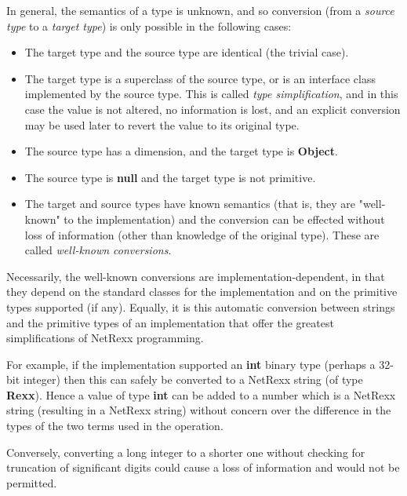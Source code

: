 In general, the semantics of a type is unknown, and so conversion (from
a \emph{source type} to a \emph{target type}) is only possible in
the following cases:
\begin{itemize}
\item The target type and the source type are identical (the trivial
case).
\item 
The target type is a superclass of the source type, or is an
interface class implemented by the source type.
This is called \emph{type simplification}, and in this case the value
is not altered, no information is lost, and an explicit conversion may
be used later to revert the value to its original type.
\item 
The source type has a dimension, and the target type
is \textbf{Object}.
\item 
The source type is \textbf{null} and the target type is not primitive.
\item 
{}
The target and source types have known semantics (that is, they are
"well-known" to the implementation) and the conversion can be
effected without loss of information (other than knowledge of the
original type).
These are called \emph{well-known conversions}.
\end{itemize}
 
Necessarily, the well-known conversions are implementation-dependent, in
that they depend on the standard classes for the implementation and on
the primitive types supported (if any).
Equally, it is this automatic conversion between strings and the
primitive types of an implementation that offer the greatest
simplifications of NetRexx programming.
 
For example, if the implementation supported an \textbf{int}
binary type (perhaps a 32-bit integer) then this can safely be
converted to a NetRexx string (of type \textbf{Rexx}).
Hence a value of type \textbf{int} can be added to a number which is a
NetRexx string (resulting in a NetRexx string) without concern over the
difference in the types of the two terms used in the operation.
 
Conversely, converting a long integer to a shorter one without checking
for truncation of significant digits could cause a loss of information
and would not be permitted.
 
